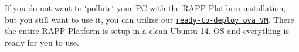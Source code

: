 If you do not want to \char`\"{}pollute\char`\"{} your P\-C with the R\-A\-P\-P Platform installation, but you still want to use it, you can utilize our \href{http://issel.ee.auth.gr/wp-content/uploads/2015/12/RAPP_platform_0.5.5.ova}{\tt ready-\/to-\/deploy ova V\-M}. There the entire R\-A\-P\-P Platform is setup in a clean Ubuntu 14. O\-S and everything is ready for you to use. 